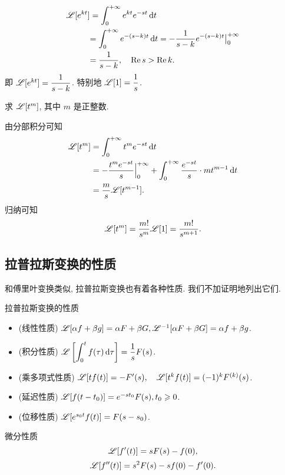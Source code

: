 \begin{solution}
	\begin{align*}
		\mathscr{L}[e^{kt}]&=\int_0^{+\infty}e^{kt}e^{-st}\,\mathrm{d} t\\
		&{=\int_0^{+\infty}e^{-(s-k)t}\,\mathrm{d} t
		=-\frac1{s-k}e^{-(s-k)t}\big|_0^{+\infty}}\\
		&{=\frac1{s-k}, \quad\operatorname{Re} s>\operatorname{Re} k.}
	\end{align*}
	即 \emph{$\mathscr{L}[e^{kt}]=\dfrac1{s-k}$}.
	特别地 \emph{$\mathscr{L}[1]=\dfrac1s$}.
\end{solution}

\begin{example}
	求 $\mathscr{L}[t^m]$, 其中 $m$ 是正整数.
\end{example}

\begin{solution}
	由分部积分可知
	\begin{align*}
		\mathscr{L}[t^m]&=\int_0^{+\infty}t^me^{-st}\,\mathrm{d} t\\
		&=-\frac{t^me^{-st}}s\Big|_0^{+\infty}+\int_0^{+\infty}\frac{e^{-st}}s\cdot mt^{m-1}\,\mathrm{d} t\\
		&=\frac ms\mathscr{L}[t^{m-1}].
	\end{align*}
	归纳可知
		\[\mathscr{L}[t^m]=\frac{m!}{s^m}\mathscr{L}[1]=\frac{m!}{s^{m+1}}.\]
\end{solution}

\subsection{拉普拉斯变换的性质}

和傅里叶变换类似, 拉普拉斯变换也有着各种性质. 我们不加证明地列出它们.

\begin{main}{拉普拉斯变换的性质}
	\begin{itemize}
		\item (线性性质) $\mathscr{L}[\alpha f+\beta g]=\alpha F+\beta G, \mathscr{L}^{-1}[\alpha F+\beta G]=\alpha f+\beta g$.
		\item (积分性质) $\displaystyle\mathscr{L}\left[\int_0^t f(\tau)\,\mathrm{d}\tau\right]=\frac 1s F(s)$.
		\item (乘多项式性质) $\mathscr{L}[tf(t)]=-F'(s),\quad\mathscr{L}[t^kf(t)]=(-1)^kF^{(k)}(s)$.
		\item (延迟性质) $\mathscr{L}[f(t-t_0)]=e^{-st_0}F(s), t_0\geqslant 0$.
		\item (位移性质) $\mathscr{L}[e^{s_0t}f(t)]=F(s-s_0)$.
	\end{itemize}
\end{main}

\begin{second}{微分性质}
	\[\mathscr{L}[f'(t)]=sF(s)-f(0),\]
	\[\mathscr{L}[f''(t)]=s^2F(s)-sf(0)-f'(0).\]
\end{second}

